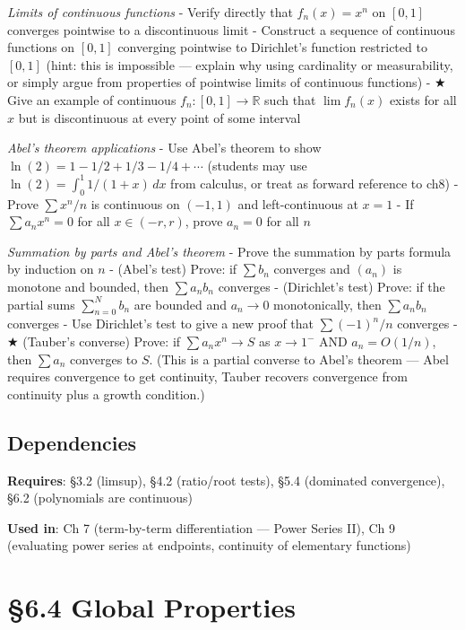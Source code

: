 \documentclass[
  10pt,
  letterpaper,
]{scrbook}
\newcommand{\RR}{\mathbb{R}}
\begin{document}
\emph{Limits of continuous functions} - Verify directly that
\(f_n(x) = x^n\) on \([0, 1]\) converges pointwise to a discontinuous
limit - Construct a sequence of continuous functions on \([0,1]\)
converging pointwise to Dirichlet's function restricted to \([0,1]\)
(hint: this is impossible --- explain why using cardinality or
measurability, or simply argue from properties of pointwise limits of
continuous functions) - ★ Give an example of continuous
\(f_n: [0, 1] \to \RR\) such that \(\lim f_n(x)\) exists for all \(x\)
but is discontinuous at every point of some interval

\emph{Abel's theorem applications} - Use Abel's theorem to show
\(\ln(2) = 1 - 1/2 + 1/3 - 1/4 + \cdots\) (students may use
\(\ln(2) = \int_0^1 1/(1+x)\,dx\) from calculus, or treat as forward
reference to ch8) - Prove \(\sum x^n/n\) is continuous on \((-1, 1)\)
and left-continuous at \(x = 1\) - If \(\sum a_n x^n = 0\) for all
\(x \in (-r, r)\), prove \(a_n = 0\) for all \(n\)

\emph{Summation by parts and Abel's theorem} - Prove the summation by
parts formula by induction on \(n\) - (Abel's test) Prove: if
\(\sum b_n\) converges and \((a_n)\) is monotone and bounded, then
\(\sum a_n b_n\) converges - (Dirichlet's test) Prove: if the partial
sums \(\sum_{n=0}^{N} b_n\) are bounded and \(a_n \to 0\) monotonically,
then \(\sum a_n b_n\) converges - Use Dirichlet's test to give a new
proof that \(\sum (-1)^n / n\) converges - ★ (Tauber's converse) Prove:
if \(\sum a_n x^n \to S\) as \(x \to 1^-\) AND \(a_n = O(1/n)\), then
\(\sum a_n\) converges to \(S\). (This is a partial converse to Abel's
theorem --- Abel requires convergence to get continuity, Tauber recovers
convergence from continuity plus a growth condition.)

\subsection{Dependencies}\label{dependencies-26}

\textbf{Requires}: §3.2 (limsup), §4.2 (ratio/root tests), §5.4
(dominated convergence), §6.2 (polynomials are continuous)

\textbf{Used in}: Ch 7 (term-by-term differentiation --- Power Series
II), Ch 9 (evaluating power series at endpoints, continuity of
elementary functions)

\section{§6.4 Global Properties}\label{global-properties}
\end{document}
